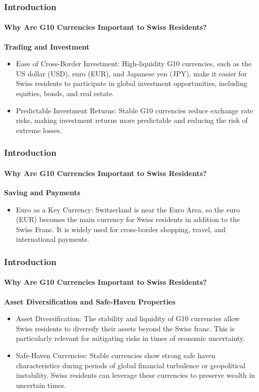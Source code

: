 \documentclass[10pt]{beamer}
\begin{document}
\begin{frame}
\frametitle{Introduction}
\framesubtitle{Why Are G10 Currencies Important to Swiss Residents?}
\textbf{Trading and Investment}
\begin{itemize}
    \item Ease of Cross-Border Investment: High-liquidity G10 currencies, such as the US dollar (USD), euro (EUR), and Japanese yen (JPY), make it easier for Swiss residents to participate in global investment opportunities, including equities, bonds, and real estate.
    \item Predictable Investment Returns: Stable G10 currencies reduce exchange rate risks, making investment returns more predictable and reducing the risk of extreme losses.
\end{itemize}
\end{frame}
\begin{frame}
\frametitle{Introduction}
\framesubtitle{Why Are G10 Currencies Important to Swiss Residents?}
\textbf{Saving and Payments}
\begin{itemize}
    \item Euro as a Key Currency: Switzerland is near the Euro Area, so the euro (EUR) becomes the main currency for Swiss residents in addition to the Swiss Franc. It is widely used for cross-border shopping, travel, and international payments.
\end{itemize}
\end{frame}
\begin{frame}
\frametitle{Introduction}
\framesubtitle{Why Are G10 Currencies Important to Swiss Residents?}
\textbf{Asset Diversification and Safe-Haven Properties}   
\begin{itemize}
    \item Asset Diversification: The stability and liquidity of G10 currencies allow Swiss residents to diversify their assets beyond the Swiss franc. This is particularly relevant for mitigating risks in times of economic uncertainty.
    \item Safe-Haven Currencies: Stable currencies show strong safe haven characteristics during periods of global financial turbulence or geopolitical instability. Swiss residents can leverage these currencies to preserve wealth in uncertain times.
\end{itemize}
\end{frame}
\end{document}
